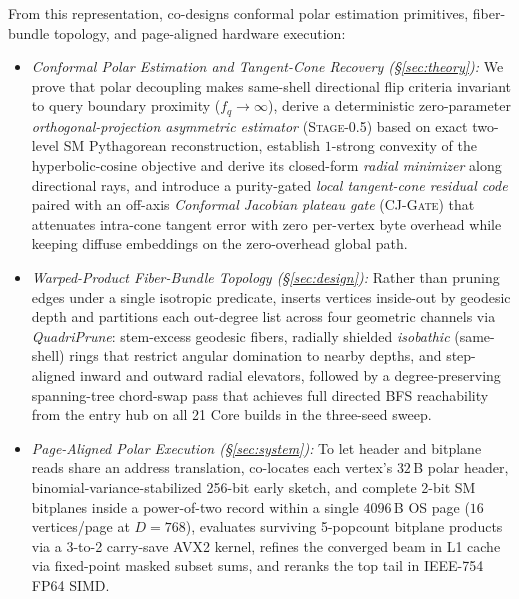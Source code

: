 From this representation, \rquiver{} co-designs conformal polar estimation primitives, fiber-bundle topology, and page-aligned hardware execution:
\begin{itemize}
  \item \emph{Conformal Polar Estimation and Tangent-Cone Recovery (\S\ref{sec:theory}):}
  We prove that polar decoupling makes same-shell directional flip criteria invariant to query boundary proximity ($f_q \to \infty$), derive a deterministic zero-parameter \emph{orthogonal-projection asymmetric estimator} (\textsc{Stage-0.5}) based on exact two-level {SM} Pythagorean reconstruction, establish $1$-strong convexity of the hyperbolic-cosine objective and derive its closed-form \emph{radial minimizer} along directional rays, and introduce a purity-gated \emph{local tangent-cone residual code} paired with an off-axis \emph{Conformal Jacobian plateau gate} (\textsc{CJ-Gate}) that attenuates intra-cone tangent error with zero per-vertex byte overhead while keeping diffuse embeddings on the zero-overhead global path.

  \item \emph{Warped-Product Fiber-Bundle Topology (\S\ref{sec:design}):}
  Rather than pruning edges under a single isotropic predicate, \rquiver{} inserts vertices inside-out by geodesic depth and partitions each out-degree list across four geometric channels via \emph{QuadriPrune}: stem-excess geodesic fibers, radially shielded \emph{isobathic} (same-shell) rings that restrict angular domination to nearby depths, and step-aligned inward and outward radial elevators, followed by a degree-preserving spanning-tree chord-swap pass that achieves full directed {BFS} reachability from the entry hub on all 21 Core builds in the three-seed sweep.

  \item \emph{Page-Aligned Polar Execution (\S\ref{sec:system}):}
  To let header and bitplane reads share an address translation, \rquiver{} co-locates each vertex's $32$\,B polar header, binomial-variance-stabilized 256-bit early sketch, and complete 2-bit {SM} bitplanes inside a power-of-two record within a single $4096$\,B OS page ($16$ vertices/page at $D=768$), evaluates surviving 5-popcount bitplane products via a 3-to-2 carry-save {AVX2} kernel, refines the converged beam in L1 cache via fixed-point masked subset sums, and reranks the top tail in IEEE-754 FP64 {SIMD}.
\end{itemize}

